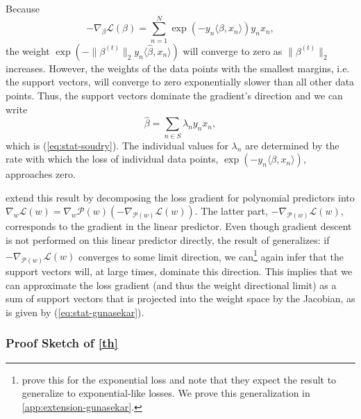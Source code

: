 \documentclass{article}
\theoremstyle{plain}
\theoremstyle{definition}
\theoremstyle{remark}
\begin{document}
Because
\begin{equation}
    -\nabla_{\beta}\mathcal{L}(\beta)=\sum_{n=1}^N\exp(-y_n\langle\beta,x_n\rangle)y_nx_n,
\end{equation}
the weight $\exp(-\|\beta^{(t)}\|_2y_n\langle\hat{\beta},x_n\rangle)$ will converge to zero as $\|\beta^{(t)}\|_2$ increases.
However, the weights of the data points with the smallest margins, i.e. the support vectors, will converge to zero exponentially slower than all other data points.
Thus, the support vectors dominate the gradient's direction and we can write
\begin{equation}
    \hat{\beta}=\sum_{n\in S}\lambda_ny_nx_n,
\end{equation}
which is (\ref{eq:stat-soudry}). The individual values for $\lambda_n$ are determined by the rate with which the loss of individual data points, $\exp(-y_n\langle\beta,x_n\rangle)$, approaches zero.

\citet{gunasekar_implicit_2018} extend this result by decomposing the loss gradient for polynomial predictors into $\nabla_w\mathcal{L}(w)=\nabla_w\mathcal{P}(w)(-\nabla_{\mathcal{P}(w)}\mathcal{L}(w))$.
The latter part, $-\nabla_{\mathcal{P}(w)}\mathcal{L}(w)$, corresponds to the gradient in the linear predictor.
Even though gradient descent is not performed on this linear predictor directly, the result of \citet{soudry_implicit_2018} generalizes: if $-\nabla_{\mathcal{P}(w)}\mathcal{L}(w)$ converges to some limit direction, we can\footnote{\citet{gunasekar_characterizing_2018} prove this for the exponential loss and note that they expect the result to generalize to exponential-like losses. We prove this generalization in \cref{app:extension-gunasekar}.} again infer that the support vectors will, at large times, dominate this direction. This implies that we can approximate the loss gradient (and thus the weight directional limit) as a sum of support vectors that is projected into the weight space by the Jacobian, as is given by (\ref{eq:stat-gunasekar}).

\subsubsection{Proof Sketch of \cref{th}}
\end{document}
